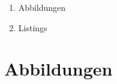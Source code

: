 
\addchap{\langanhang}

\renewcommand{\thefigure}{A.\arabic{figure}}
\setcounter{figure}{0}
\renewcommand{\thetable}{A.\arabic{table}}
\setcounter{table}{0}
\renewcommand{\thelstlisting}{A.\arabic{lstlisting}}
\setcounter{lstlisting}{0}

 

{\Large
\begin{enumerate}[label=\Alph*.]
	\item Abbildungen
	\item Listings
\end{enumerate}
}
\pagebreak

\chapter*{Abbildungen}


